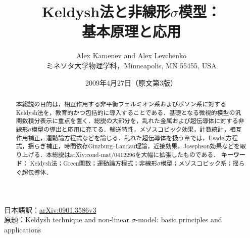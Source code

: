 \documentclass[a4paper,11pt]{ltjsarticle}
\title{\bfseries Keldysh法と非線形$\sigma$模型：\\基本原理と応用}
\author{Alex Kamenev and Alex Levchenko\\
{\small ミネソタ大学物理学科，Minneapolis, MN 55455, USA}}
\date{2009年4月27日（原文第3版）}
\begin{document}
\maketitle
\begin{center}
{\small 日本語訳：\href{https://arxiv.org/abs/0901.3586v3}{arXiv:0901.3586v3}\\
原題：Keldysh technique and non-linear $\sigma$-model: basic principles and applications}
\end{center}
\nocite{Keldysh-1964,KonstantinovPerel,Schwinger,KadanoffBaym,Feynman,Wyld,MSR,DeDominicis,Lifshitz,RammerSmith,
SmithJensen-book,Mahan,Rammer-book,SchwabRaimondi,Spicka,Kamenev,Matsubara,AGD,Gardiner,Risken,
HorbachSchon,KamenevAndreev,ChamonLudwigNayak,Feigel'manLarkinSkvortsov,Edwards,Wegner,EfetovLarkinKhmelnitskii,Finkel'stein,BelitzKirkpatrick,Lerner,
Efetov,Efetov-book,Mirlin,NegeleOrland,Leggett,CaldeiraLeggett,Elgart,FeynmanHibbs,LarkinOvchinnikov,Kubo,
Landauer,Buttiker,Reviews-on-Landauer-1,Reviews-on-Landauer-2,Lesovik,Kogan,Blanter-Buttiker,Martin,Pogrebinskii,Price,
Solomon,Gramila,Sivan,Lilly,Pillarisetty,Smith,MacDonald,Kamenev-Oreg,Flensberg,Debray-1,
Debray-2,Morimoto,Yamamoto,Aguado,Kouwenhoven,Khrapai,Reznikov,LevchenkoKamenev-QPC,Glazman-QPC,Nazarov-TunnelingAction,
BelzigNazarov,FKLS,ABG,Nazarov-CBWTJ,SnymanNazarov,Usadel,Pierre,Hikami,Gor'kovLarkinKhmelnitskii,AAKL,
LeeRamakrishnan,ALW-book,AltshulerShklovskii,Mehta,AltlandKamenev,Altshuler-UCF,LeeStone,LeeStoneFukuyama,AKL-UCF,Beenakker,
LevitovLesovik-1,LevitovLesovik-2,LevitovLee,Nazarov-FCS,Levitov-FCS,Zala,Altshuler,AltshulerAronov-KE,CatelaniAleiner,KoganShulman,
Nagaev,Gutman,Bagrets,DimitrovaKtavtsov,BurmiChelk,AltshulerAronov,AAL,AltshulerAronov-review,Finkel'stein94,Nazarov-ZBA,
LevitovShytov,Kopietz,GutmanGefen,Schmid,Blanter,Drag-Third-order,SkvortsovLarkinFeigel'man,Gor'kov,Nambu,NarozhnyAleiner,
BelzigWilhelm,SchmidtSchon,LarkinOvchinnikov-F,Tinkham,Kopnin,LarkinOvchinnikov-KinEq,Zaitsev,KuprianovLukichev,Lambert,BelzigBruder,
Gueron,Zhou,Hammer,Heikkila,Wilhelm,ZhouSpivak,StoofNazarov,Virtanen,Stenberg,Crosser,
Gor'kov-GL,GinzburgLandau,Gor'kovEliashberg,HoughtonMaki,HuThompson,Kramer,SchonAmbegaokar,Hu,Krempasky,Otterlo,
Larkin-Varlamov,AltlandSimons,YurkevichLerner,LevchenkoKamenev,AslamazovLarkin,Maki,Thompson,GolubovKupriyanov,Levchenko-DOS,KulikOmelyanchuk,
Levchenko-Js,Hurault,Abrahams,VarlamovDorin,DiCastro,Reizer,Kulik,Scalapino,Martin-Balatsky,Levchenko-J-Noise}
\begin{abstract}
本総説の目的は，相互作用する非平衡フェルミオン系およびボソン系に対するKeldysh法を，教育的かつ包括的に導入することである．基礎となる微視的模型の汎関数積分表示に重点を置く．総説の大部分を，乱れた金属および超伝導体に対する非線形$\sigma$模型の導出と応用に充てる．輸送特性，メゾスコピック効果，計数統計，相互作用補正，運動論方程式などを論じる．乱れた超伝導体を扱う章では，Usadel方程式，揺らぎ補正，時間依存Ginzburg--Landau理論，近接効果，Josephson効果などを取り上げる．本総説はarXiv:cond-mat/0412296を大幅に拡張したものである．
\bigskip
\noindent\textbf{キーワード：} Keldysh法；Green関数；運動論方程式；非線形$\sigma$模型；メゾスコピック系；揺らぐ超伝導体．
\end{abstract}
\end{document}
